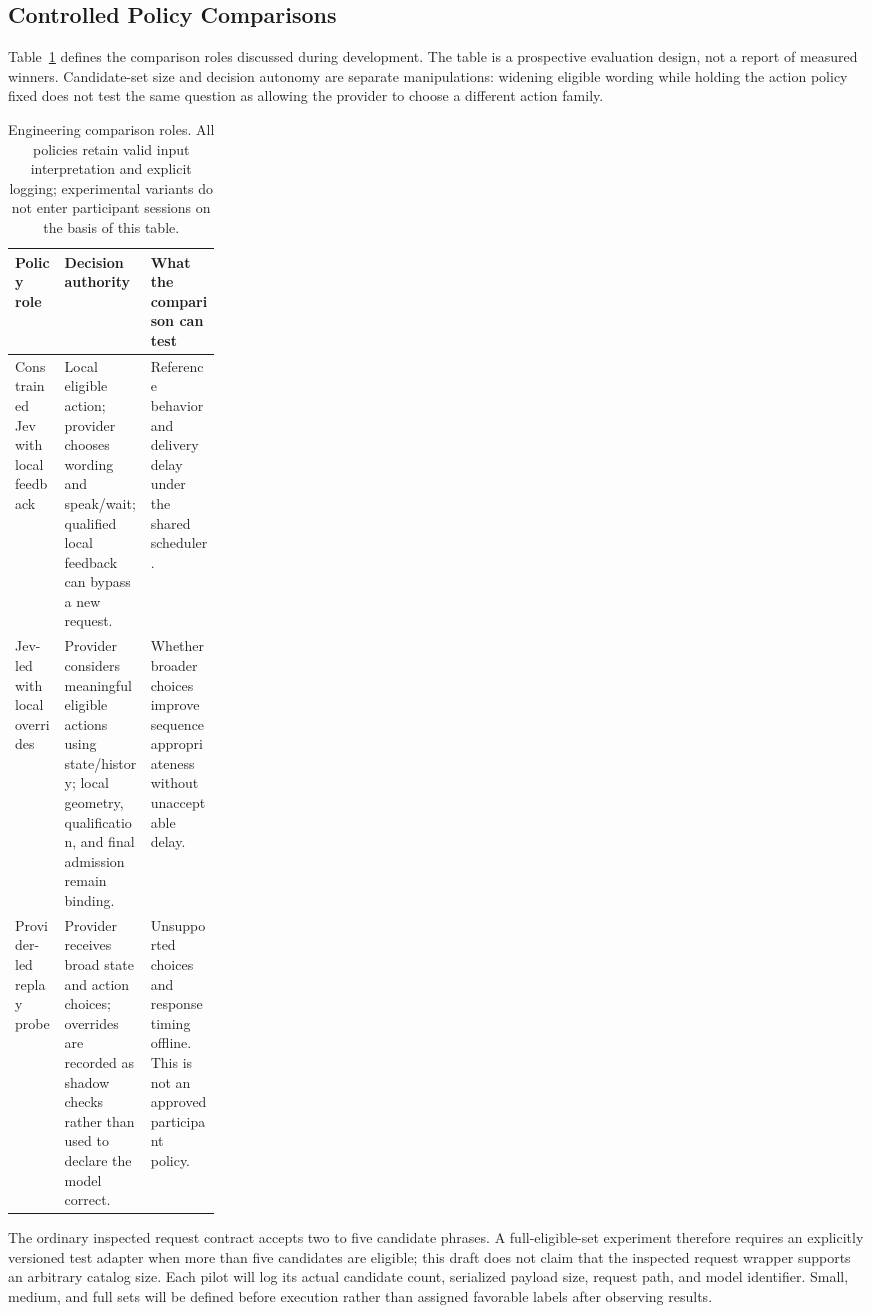 \subsection{Controlled Policy Comparisons}
Table~\ref{tab:policy-pilots} defines the comparison roles discussed during development. The table is a prospective evaluation design, not a report of measured winners. Candidate-set size and decision autonomy are separate manipulations: widening eligible wording while holding the action policy fixed does not test the same question as allowing the provider to choose a different action family.

\begin{table}[htbp]\centering
\caption[Proposed policy comparison and safeguards]{Engineering comparison roles. All policies retain valid input interpretation and explicit logging; experimental variants do not enter participant sessions on the basis of this table.}
\label{tab:policy-pilots}
\small{}
\begin{tabularx}{\linewidth}{@{}p{0.24\linewidth}XX@{}}\toprule
Policy role & Decision authority & What the comparison can test \\\midrule
Constrained Jev with local feedback & Local eligible action; provider chooses wording and speak/wait; qualified local feedback can bypass a new request. & Reference behavior and delivery delay under the shared scheduler. \\
Jev-led with local overrides & Provider considers meaningful eligible actions using state/history; local geometry, qualification, and final admission remain binding. & Whether broader choices improve sequence appropriateness without unacceptable delay. \\
Provider-led replay probe & Provider receives broad state and action choices; overrides are recorded as shadow checks rather than used to declare the model correct. & Unsupported choices and response timing offline. This is not an approved participant policy. \\\bottomrule
\end{tabularx}
\end{table}

The ordinary inspected request contract accepts two to five candidate phrases. A full-eligible-set experiment therefore requires an explicitly versioned test adapter when more than five candidates are eligible; this draft does not claim that the inspected request wrapper supports an arbitrary catalog size. Each pilot will log its actual candidate count, serialized payload size, request path, and model identifier. Small, medium, and full sets will be defined before execution rather than assigned favorable labels after observing results.

